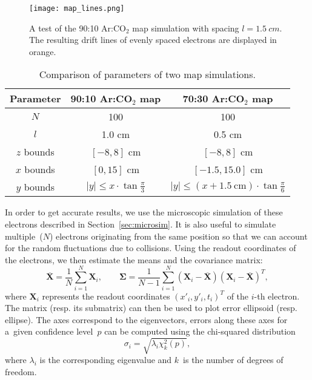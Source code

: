 		\begin{figure}
			\centering
			\texttt{[image: map\_lines.png]}
			\caption{A test of the 90:10 Ar:CO$_2$ map simulation with spacing $l = \SI{1.5}{cm}$. The resulting drift lines of evenly spaced electrons are displayed in orange.}
			\label{fig:maplines}
		\end{figure}
		
		\begin{table}
			\centering
			\caption{Comparison of parameters of two map simulations.}
			{\renewcommand{\arraystretch}{1.2}
			\begin{tabular}{|c|c|c|}
				\hline
				\textbf{Parameter} & \textbf{90:10 Ar:CO$_2$ map} & \textbf{70:30 Ar:CO$_2$ map}\\
				\hline
				$N$ & 100 & 100 \\
				\hline
				$l$ & 1.0 cm & 0.5 cm \\
				\hline
				$z$ bounds & $[-8,8]$ cm & $[-8,8]$ cm \\
				\hline
				$x$ bounds & $[0,15]$ cm & $[-1.5,15.0]$ cm \\
				\hline
				$y$ bounds & $|y| \leq x\cdot\tan\frac{\pi}{3}$ & $|y| \leq (x+\SI{1.5}{\centi\meter})\cdot\tan\frac{\pi}{6}$ \\
				\hline
			\end{tabular}}
			\label{tab:map}
		\end{table}
		
		In order to get accurate results, we use the microscopic simulation of these electrons described in Section~\ref{sec:microsim}. It is also useful to simulate multiple~($N$) electrons originating from the same position so that we can account for the random fluctuations due to collisions. Using the readout coordinates of the electrons, we then estimate the means and the covariance matrix:
			\begin{equation}
				\label{eq:cov}
				\mathbf{\overline{X}} = \frac{1}{N}\sum_{i=1}^{N} \mathbf{X}_i,\qquad \mathbf{\Sigma} = \frac{1}{N-1}\sum_{i=1}^{N}(\mathbf{X}_i-\mathbf{\overline{X}})(\mathbf{X}_i-\mathbf{\overline{X}})^T,
			\end{equation}
		where $\mathbf{X}_i$ represents the readout coordinates $(x'_i, y'_i, t_i)^T$ of the $i$\nobreakdash-th electron. The matrix (resp. its submatrix) can then be used to plot error ellipsoid (resp. ellipse). The axes correspond to the eigenvectors, errors along these axes for a~given confidence level~$p$ can be computed using the chi\nobreakdash-squared distribution
			\begin{equation}
				\label{eq:sigma}
				\sigma_i = \sqrt{\lambda_i \chi^2_k(p)},
			\end{equation}
		where $\lambda_i$ is the corresponding eigenvalue and $k$~is the number of degrees of freedom.
		
